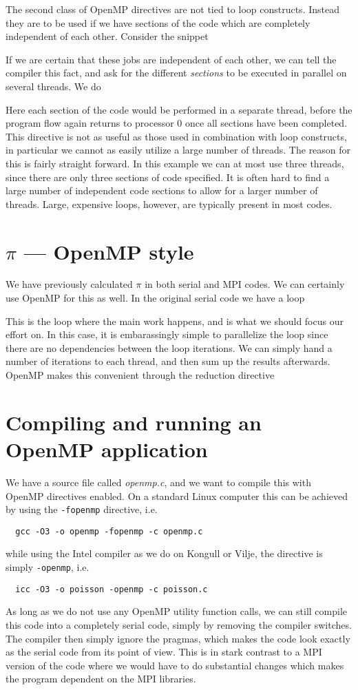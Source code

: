 The second class of OpenMP directives are not tied to loop constructs. Instead
they are to be used if we have sections of the code which are completely
independent of each other. Consider the snippet

If we are certain that these jobs are independent of each other, we can tell the
compiler this fact, and ask for the different \emph{sections} to be executed in
parallel on several threads. We do

Here each section of the code would be performed in a separate thread, before
the program flow again returns to processor 0 once all sections have been
completed. This directive is not as useful as those used in combination with
loop constructs, in particular we cannot as easily utilize a large number of
threads. The reason for this is fairly straight forward. In this example we can
at most use three threads, since there are only three sections of code
specified. It is often hard to find a large number of independent code sections
to allow for a larger number of threads. Large, expensive loops, however, are
typically present in most codes.

\section{$\pi$ --- OpenMP style}
We have previously calculated $\pi$ in both serial and MPI codes. We can
certainly use OpenMP for this as well. In the original serial code we have a
loop

This is the loop where the main work happens, and is what we should focus our
effort on. In this case, it is embarassingly simple to parallelize the loop
since there are no dependencies between the loop iterations. We can simply hand
a number of iterations to each thread, and then sum up the results afterwards.
OpenMP makes this convenient through the reduction directive


\section{Compiling and running an OpenMP application}

We have a source file called \emph{openmp.c}, and we want to compile this with
OpenMP directives enabled. On a standard Linux computer this can be achieved by
using the \texttt{-fopenmp} directive, i.e.
\begin{lstlisting}
  gcc -O3 -o openmp -fopenmp -c openmp.c
\end{lstlisting}
while using the Intel compiler as we do on Kongull or Vilje, the directive is
simply \texttt{-openmp}, i.e.
\begin{lstlisting}
  icc -O3 -o poisson -openmp -c poisson.c
\end{lstlisting}
As long as we do not use any OpenMP utility function calls, we can still compile
this code into a completely serial code, simply by removing the compiler
switches. The compiler then simply ignore the pragmas, which makes the code look
exactly as the serial code from its point of view. This is in stark contrast to
a MPI version of the code where we would have to do substantial changes which
makes the program dependent on the MPI libraries.

